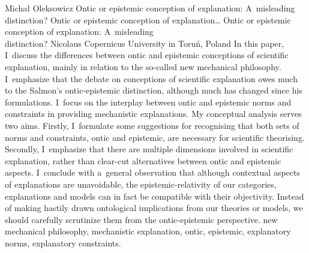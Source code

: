 \begin{artengenv}{Michał Oleksowicz}
	{Ontic or epistemic conception of explanation: A~misleading distinction?}
	{Ontic or epistemic conception of explanation\ldots}
	{Ontic or epistemic conception of explanation: A~misleading\\distinction?}
	{Nicolaus Copernicus University in Toruń, Poland}
	{In this paper, I~discuss the differences between ontic and epistemic conceptions of scientific explanation, mainly in relation to the so-called new mechanical philosophy. I~emphasize that the debate on conceptions of scientific explanation owes much to the Salmon's ontic-epistemic distinction, although much has changed since his formulations. I~focus on the interplay between ontic and epistemic norms and constraints in providing mechanistic explanations. My conceptual analysis serves two aims. Firstly, I~formulate some suggestions for recognising that both sets of norms and constraints, ontic and epistemic, are necessary for scientific theorising. Secondly, I~emphasize that there are multiple dimensions involved in scientific explanation, rather than clear-cut alternatives between ontic and epistemic aspects. I~conclude with a~general observation that although contextual aspects of explanations are unavoidable, the epistemic-relativity of our categories, explanations and models can in fact be compatible with their objectivity. Instead of making hastily drawn ontological implications from our theories or models, we should carefully scrutinize them from the ontic-epistemic perspective.
	}
	{new mechanical philosophy, mechanistic explanation, ontic, epistemic, explanatory norms, explanatory constraints.}




\end{artengenv}
